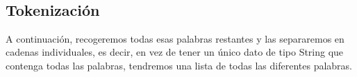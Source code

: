 \documentclass[10pt, a4paper]{article}
\begin{document}
    \begin{center}
    \end{center}
    { \hspace*{\fill} \\}
    
    \begin{center}
    \end{center}
    { \hspace*{\fill} \\}
    
    \begin{center}
    \end{center}
    { \hspace*{\fill} \\}
    
    \begin{center}
    \end{center}
    { \hspace*{\fill} \\}
    
    

\subsection{Tokenización}

A continuación, recogeremos todas esas palabras restantes y las separaremos en cadenas individuales, es decir, en vez de tener un único dato de tipo String que contenga todas las palabras, tendremos una lista de todas las diferentes palabras. 
\end{document}
